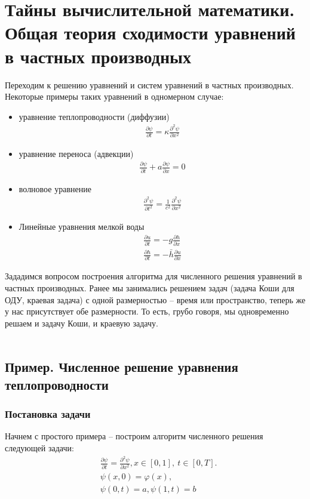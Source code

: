 \documentclass[12pt]{article}
\newcommand{\pt}{\partial t}
\newcommand{\px}{\partial x}
\newcommand{\p}{\partial}
\begin{document}
\section{Тайны вычислительной математики. Общая теория сходимости уравнений в частных производных}

Переходим к решению уравнений и систем уравнений в частных производных. \\
Некоторые примеры таких уравнений в одномерном случае:
\begin{itemize}
	\item уравнение теплопроводности (диффузии)
	\begin{align}
	\frac{\p \psi}{\pt} =\kappa \frac{\p^2 \psi}{\px^2}
	\end{align}
	\item уравнение переноса (адвекции)
	\begin{align}
	\frac{\p \psi}{\pt} + a \frac{\p \psi}{\px} = 0
	\end{align}
	\item волновое уравнение
	\begin{align}
	\frac{\p^2 \psi}{\pt^2} = \frac{1}{c^2} \frac{\p^2 \psi}{\px^2}
	\end{align}
	\item Линейные уравнения мелкой воды
	\begin{align}
	\frac{\p u}{\pt} = -g \frac{\p h}{\px} \\
	\frac{\p h}{\pt} = -\bar{h} \frac{\p u}{\px}
	\end{align}
\end{itemize}
Зададимся вопросом построения алгоритма для численного решения уравнений в частных производных. Ранее мы занимались решением задач (задача Коши для ОДУ, краевая задача) с одной размерностью -- время или пространство, теперь же у нас присутствует обе размерности. То есть, грубо говоря, мы одновременно решаем и задачу Коши, и краевую задачу.\\
\\
\subsection{Пример. Численное решение уравнения теплопроводности}
\subsubsection{Постановка задачи}
Начнем с простого примера -- построим алгоритм численного решения следующей задачи:
\begin{align}\label{eq_dif}
&\frac{\p \psi}{\pt} = \frac{\p^2 \psi}{\px^2}, x\in[0,1],\ t\in [0,T]. \\
&\psi(x,0) = \varphi(x), \\
&\psi(0,t) = a, \psi(1,t) = b \label{boundary}
\end{align}
\end{document}
